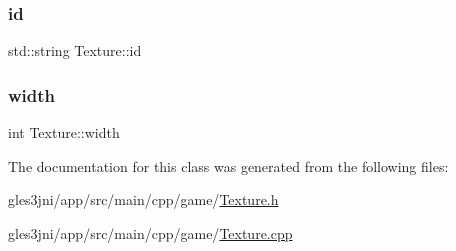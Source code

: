 \subsubsection{\texorpdfstring{id}{id}}
{\footnotesize\ttfamily std\+::string Texture\+::id\hspace{0.3cm}{\ttfamily [private]}}

\mbox{\label{class_texture_a06a0246cb31343557c3441c5733349cd}} 
\subsubsection{\texorpdfstring{width}{width}}
{\footnotesize\ttfamily int Texture\+::width\hspace{0.3cm}{\ttfamily [private]}}



The documentation for this class was generated from the following files\+:\begin{DoxyCompactItemize}
\item 
gles3jni/app/src/main/cpp/game/\hyperlink{_texture_8h}{Texture.\+h}\item 
gles3jni/app/src/main/cpp/game/\hyperlink{_texture_8cpp}{Texture.\+cpp}\end{DoxyCompactItemize}
